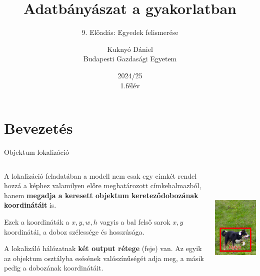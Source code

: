 \documentclass[english, aspectratio=169]{beamer}
\makeatletter
\newcommand\makebeamertitle{\frame{\maketitle}}
\let\origtableofcontents=\tableofcontents
\def\tableofcontents{\@ifnextchar[{\origtableofcontents}{\gobbletableofcontents}}
\def\gobbletableofcontents#1{\origtableofcontents}
\makeatother
\begin{document}
\section{Bevezetés}
\title[]{Adatbányászat a gyakorlatban}
\subtitle{9. Előadás: Egyedek felismerése}
\author[Kuknyó Dániel]{Kuknyó Dániel\\Budapesti Gazdasági Egyetem}
\date{2024/25\\1.félév}
\makebeamertitle

\begin{frame}
\tableofcontents{}
\end{frame}

\begin{frame}
\tableofcontents[currentsection]
\end{frame}

\begin{frame}{Objektum lokalizáció}
\begin{columns}
\begin{column}{.5\textwidth}
A lokalizáció feladatában a modell nem csak egy címkét rendel hozzá a képhez valamilyen előre meghatározott címkehalmazból, hanem \textbf{megadja a keresett objektum kereteződobozának koordinátáit} is.\par\smallskip
Ezek a koordináták a $x,y,w,h$ vagyis a bal felső sarok $x,y$ koordinátái, a doboz szélessége és hosszúsága.\par\smallskip
A lokalizáló hálózatnak \textbf{két output rétege} (feje) van. Az egyik az objektum osztályba esésének valószínűségét adja meg, a másik pedig a dobozának koordinátáit.
\end{column}
\begin{column}{.5\textwidth}
\begin{center}
\includegraphics[height=6cm, width=7cm, keepaspectratio]{images/instance_11.png}
\end{center}
\end{column}
\end{columns}
\end{frame}
\end{document}
